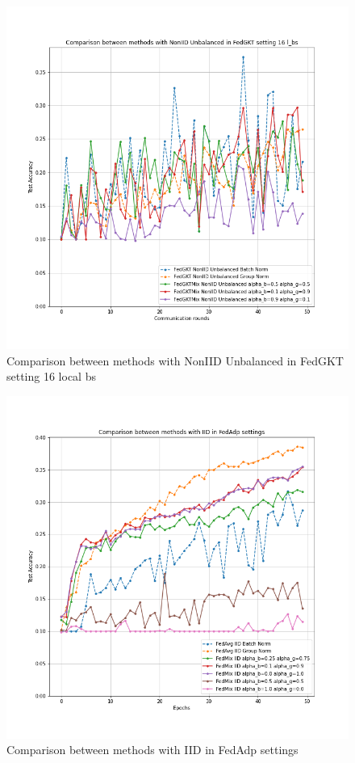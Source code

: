 \documentclass[conference]{IEEEtran}
\begin{document}
\begin{figure}[htb]
    \centering
    \includegraphics[width=\columnwidth]{Images/Comparison between methods with NonIID Unbalanced in FedGKT setting 16 l_bs.png}
    \caption{Comparison between methods with NonIID Unbalanced in FedGKT setting 16 local bs}
    \label{fig:appendix7}
\end{figure}
\begin{figure}[htb]
    \centering
    \includegraphics[width=\columnwidth]{Images/Comparison between methods with IID in FedAdp settings.png}
    \caption{Comparison between methods with IID in FedAdp settings}
    \label{fig:appendix8}
\end{figure}
\end{document}
